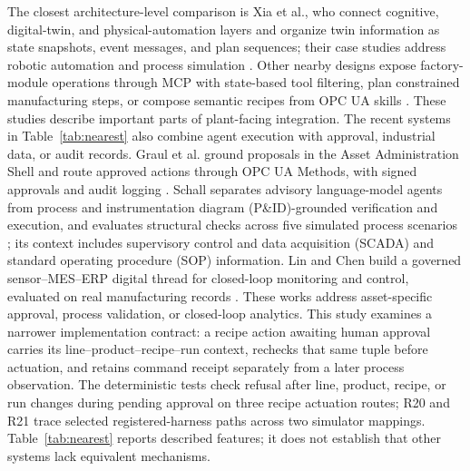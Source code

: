 The closest architecture-level comparison is Xia et al., who connect cognitive,
digital-twin, and physical-automation layers and organize twin information as
state snapshots, event messages, and plan sequences; their case studies
address robotic automation and process simulation
\cite{xia2025architecture}. Other nearby designs expose factory-module
operations through MCP with state-based tool filtering, plan constrained
manufacturing steps, or compose semantic recipes from OPC UA skills
\cite{koehle2026llmdriven,silva2025mcpmanufacturing,koehle2025semanticrecipes}.
These studies describe important parts of plant-facing integration. The
recent systems in Table~\ref{tab:nearest} also combine agent execution with
approval, industrial data, or audit records. Graul et al. ground proposals in
the Asset Administration Shell and route approved actions through OPC UA
Methods, with signed approvals and audit logging
\cite{graul2026aas}. Schall separates advisory language-model agents from
process and instrumentation diagram (P\&ID)-grounded verification and
execution, and evaluates structural checks across five simulated process
scenarios \cite{schall2026safe}; its context includes supervisory control and
data acquisition (SCADA) and standard operating procedure (SOP) information.
Lin and Chen build a governed sensor--MES--ERP digital thread for closed-loop
monitoring and control, evaluated on real manufacturing
records \cite{lin2026agentic}. These works address asset-specific approval,
process validation, or closed-loop analytics. This study examines a narrower
implementation contract: a recipe action awaiting human approval carries its
line--product--recipe--run context, rechecks that same tuple before actuation,
and retains command receipt separately from a later process observation. The
deterministic tests check refusal after line, product, recipe, or run changes
during pending approval on three recipe actuation routes; R20 and R21 trace
selected registered-harness paths across two simulator mappings.
Table~\ref{tab:nearest} reports described features; it does not establish that
other systems lack equivalent mechanisms.
